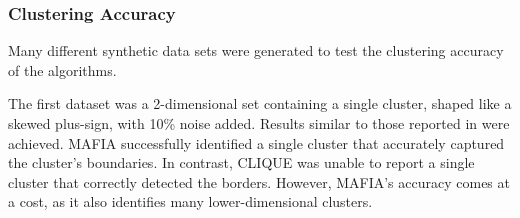 \subsubsection{Clustering Accuracy}
Many different synthetic data sets were generated to test the clustering accuracy of the algorithms.

The first dataset was a 2-dimensional set containing a single cluster, shaped like a skewed plus-sign, with 10\% noise added. Results similar to those reported in \cite{mafia} were achieved. MAFIA successfully identified a single cluster that accurately captured the cluster's boundaries. In contrast, CLIQUE was unable to report a single cluster that correctly detected the borders. However, MAFIA's accuracy comes at a cost, as it also identifies many lower-dimensional clusters.


